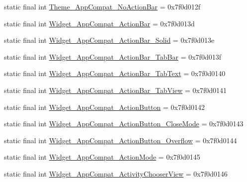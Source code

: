 \begin{DoxyCompactItemize}
\item 
static final int \mbox{\hyperlink{classcom_1_1google_1_1android_1_1gms_1_1R_1_1style_a49b081ecb0d9dde102062b30106b2f9a}{Theme\+\_\+\+App\+Compat\+\_\+\+No\+Action\+Bar}} = 0x7f0d012f
\item 
static final int \mbox{\hyperlink{classcom_1_1google_1_1android_1_1gms_1_1R_1_1style_a224473e4aaca84503703fcecbba407d0}{Widget\+\_\+\+App\+Compat\+\_\+\+Action\+Bar}} = 0x7f0d013d
\item 
static final int \mbox{\hyperlink{classcom_1_1google_1_1android_1_1gms_1_1R_1_1style_a2c775c17f644d1f006a085fe7e997435}{Widget\+\_\+\+App\+Compat\+\_\+\+Action\+Bar\+\_\+\+Solid}} = 0x7f0d013e
\item 
static final int \mbox{\hyperlink{classcom_1_1google_1_1android_1_1gms_1_1R_1_1style_abd245920f274e48425ee60e2fb4296a1}{Widget\+\_\+\+App\+Compat\+\_\+\+Action\+Bar\+\_\+\+Tab\+Bar}} = 0x7f0d013f
\item 
static final int \mbox{\hyperlink{classcom_1_1google_1_1android_1_1gms_1_1R_1_1style_af1a02f6d45583de00ced2ecdd1a04773}{Widget\+\_\+\+App\+Compat\+\_\+\+Action\+Bar\+\_\+\+Tab\+Text}} = 0x7f0d0140
\item 
static final int \mbox{\hyperlink{classcom_1_1google_1_1android_1_1gms_1_1R_1_1style_a0a14b493651682ce6d06358cf4bae4a8}{Widget\+\_\+\+App\+Compat\+\_\+\+Action\+Bar\+\_\+\+Tab\+View}} = 0x7f0d0141
\item 
static final int \mbox{\hyperlink{classcom_1_1google_1_1android_1_1gms_1_1R_1_1style_a352cf8bf7317e94b8120e8b54e726a90}{Widget\+\_\+\+App\+Compat\+\_\+\+Action\+Button}} = 0x7f0d0142
\item 
static final int \mbox{\hyperlink{classcom_1_1google_1_1android_1_1gms_1_1R_1_1style_a133e672764b11e903804a99dd6990028}{Widget\+\_\+\+App\+Compat\+\_\+\+Action\+Button\+\_\+\+Close\+Mode}} = 0x7f0d0143
\item 
static final int \mbox{\hyperlink{classcom_1_1google_1_1android_1_1gms_1_1R_1_1style_afccfedafa10db35c5fe1a3333bf1697b}{Widget\+\_\+\+App\+Compat\+\_\+\+Action\+Button\+\_\+\+Overflow}} = 0x7f0d0144
\item 
static final int \mbox{\hyperlink{classcom_1_1google_1_1android_1_1gms_1_1R_1_1style_a7df31940ba8cbd5c428018ef31f0c299}{Widget\+\_\+\+App\+Compat\+\_\+\+Action\+Mode}} = 0x7f0d0145
\item 
static final int \mbox{\hyperlink{classcom_1_1google_1_1android_1_1gms_1_1R_1_1style_abb8de9ef9672c8edb6bd2700807dacab}{Widget\+\_\+\+App\+Compat\+\_\+\+Activity\+Chooser\+View}} = 0x7f0d0146

\end{DoxyCompactItemize}
